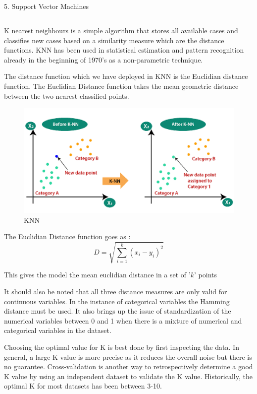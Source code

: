 \documentclass[12pt]{article}
\newcommand{\msize}{\fontsize{14pt}{12pt}\selectfont}
\begin{document}
 5. Support Vector Machines 
\newpage
\subsection{\msize{\textbf{K NEAREST NEIGHBOURS}}}
K nearest neighbours is a simple algorithm that stores all available cases and classifies new cases based on a similarity measure which are the distance functions. KNN has been used in statistical estimation and pattern recognition already in the beginning of 1970’s as a non-parametric technique. 

The distance function which we have deployed in KNN is the Euclidian distance function. The Euclidian Distance function takes the mean geometric distance between the two nearest classified points. 

\begin{center}
\begin{figure}[h]
\centerline{\includegraphics[scale=.6]{IMG_8202.png}}
\caption{KNN}
\end{figure}
\end{center}

The Euclidian Distance function goes as : 
\begin{equation*}
D=\sqrt{\sum_{i=1}^{k}{(x_i - y_i)^2}}
\end{equation*}

This gives the model the mean euclidian distance in a set of '$k$' points 

It should also be noted that all three distance measures are only valid for continuous variables. In the instance of categorical variables the Hamming distance must be used. It also brings up the issue of standardization of the numerical variables between 0 and 1 when there is a mixture of numerical and categorical variables in the dataset.

Choosing the optimal value for K is best done by first inspecting the data. In general, a large K value is more precise as it reduces the overall noise but there is no guarantee. Cross-validation is another way to retrospectively determine a good K value by using an independent dataset to validate the K value. Historically, the optimal K for most datasets has been between 3-10.
\end{document}
